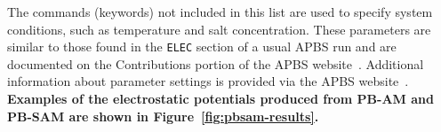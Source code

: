 \documentclass[12pt,titlepage]{article}
\newcommand{\keyword}[1]{\texttt{#1}}
\newcommand{\revision}[1]{\color{red} \textbf{#1} \leavevmode\color{black}}
\begin{document}
The commands (keywords) not included in this list are used to specify system conditions, such as temperature and salt concentration. These parameters are similar to those found in the \keyword{ELEC} section of a usual APBS run and are documented on the Contributions portion of the APBS website~\cite{APBSweb}. 
Additional information about parameter settings is provided via the APBS website~\cite{APBSweb}.
\revision{Examples of the electrostatic potentials produced from PB-AM and PB-SAM are shown in Figure~\ref{fig:pbsam-results}.}

\printbibliography
\end{document}

